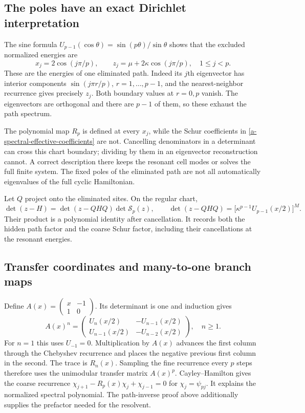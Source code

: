 \subsection{The poles have an exact Dirichlet interpretation}

The sine formula $U_{p-1}(\cos\theta)=\sin(p\theta)/\sin\theta$
shows that the excluded normalized energies are
\begin{equation}
 x_j=2\cos(j\pi/p),\qquad
 z_j=\mu+2\kappa\cos(j\pi/p),\quad 1\leq j<p.
 \label{a-spectral-dirichlet-resonances}
\end{equation}
These are the energies of one eliminated path. Indeed its $j$th
eigenvector has interior components $\sin(j\pi r/p)$,
$r=1,\ldots,p-1$, and the nearest-neighbor recurrence gives precisely
$z_j$. Both boundary values at $r=0,p$ vanish. The eigenvectors are
orthogonal and there are $p-1$ of them, so these exhaust the path spectrum.

The polynomial map $R_p$ is defined at every $x_j$, while the Schur
coefficients in \eqref{a-spectral-effective-coefficients} are not.
Cancelling denominators in a determinant can cross this chart boundary;
dividing by them in an eigenvector reconstruction cannot. A correct
description there keeps the resonant cell modes or solves the full
finite system. The fixed poles of the eliminated path are not all
automatically eigenvalues of the full cyclic Hamiltonian.

Let $Q$ project onto the eliminated sites. On the regular chart,
\[
 \det(z-H)=\det(z-QHQ)\det\mathcal S_p(z),\qquad
 \det(z-QHQ)=\bigl[\kappa^{p-1}U_{p-1}(x/2)\bigr]^M.
\]
Their product is a polynomial identity after cancellation. It records
both the hidden path factor and the coarse Schur factor, including
their cancellations at the resonant energies.

\subsection{Transfer coordinates and many-to-one branch maps}

Define $A(x)=\begin{pmatrix}x&-1\\1&0\end{pmatrix}$. Its determinant
is one and induction gives
\begin{equation}
 A(x)^n=\begin{pmatrix}
 U_n(x/2)&-U_{n-1}(x/2)\\
 U_{n-1}(x/2)&-U_{n-2}(x/2)
 \end{pmatrix},\quad n\geq1.
 \label{a-spectral-transfer-power}
\end{equation}
For $n=1$ this uses $U_{-1}=0$. Multiplication by $A(x)$ advances
the first column through the Chebyshev recurrence and places the
negative previous first column in the second. The trace is $R_n(x)$.
Sampling the fine recurrence every $p$ steps therefore uses the
unimodular transfer matrix $A(x)^p$. Cayley--Hamilton gives the coarse
recurrence $\chi_{j+1}-R_p(x)\chi_j+\chi_{j-1}=0$ for
$\chi_j=\psi_{pj}$. It explains the normalized spectral polynomial.
The path-inverse proof above additionally supplies the prefactor needed
for the resolvent.

